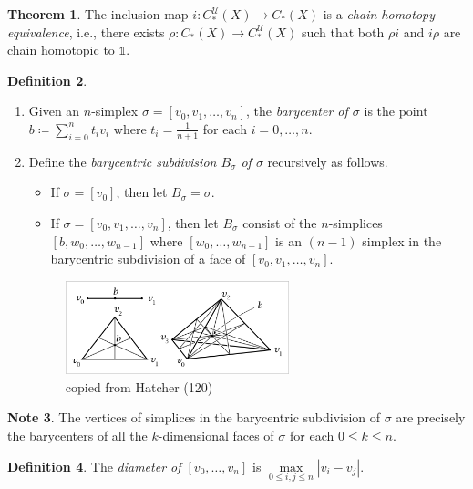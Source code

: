 \documentclass[10pt,letterpaper,cm]{nupset}
\theoremstyle{definition}
\newtheorem{definition}{Definition}[subsection]
\newtheorem{note}[definition]{Note}
\theoremstyle{theorem}
\newtheorem{theorem}[definition]{Theorem}
\theoremstyle{remark}
\newcommand{\U}{\mathcal U}
\newcommand{\1}{\mathbb{1}}
\newcommand{\0}{\vec 0}
\begin{document}
\begin{theorem}
The inclusion map $i: C_{\ast}^{\U}(X) \to C_{\ast}(X)$ is a \textit{chain homotopy equivalence}, i.e., there exists $\rho : C_{\ast}(X) \to C_{\ast}^{\U}(X)$ such that both  $\rho i$ and  $i \rho$ are chain homotopic to $\1$.
\end{theorem}

\begin{definition} $ $
\begin{enumerate}
\item Given an $n$-simplex $\sigma = [v_0, v_1, \ldots, v_n]$, the \textit{barycenter of $\sigma$} is the point $b\coloneqq  \sum_{i=0}^n t_iv_i$ where $t_i = \frac{1}{n+1}$ for each $i=0, \ldots, n$.
\item Define the \textit{barycentric subdivision $B_{\sigma}$ of $\sigma$} recursively as follows.
\begin{itemize}
\item If $\sigma = [v_0]$, then let $B_{\sigma} = \sigma$.
\item If $\sigma = [v_0, v_1, \ldots, v_n]$, then let $B_{\sigma}$ consist of the $n$-simplices $[b, w_0, \ldots, w_{n-1}]$ where $[w_0, \ldots, w_{n-1}]$ is an $(n-1)$ simplex in the barycentric subdivision of a face of $[v_0, v_1, \ldots, v_n]$.
\end{itemize}
\begin{figure}[H]
\centering
\includegraphics[width=65mm]{Hatcher-barycentric.png}
\caption{copied from Hatcher (120) \label{overflow}}
\end{figure}
\end{enumerate}
\end{definition}

\begin{note}
The vertices of simplices in the barycentric subdivision of $\sigma$ are precisely the barycenters of all the $k$-dimensional faces of $\sigma$ for each $0\leq k\leq n$.
\end{note}


\begin{definition}
The \textit{diameter of $[v_0, \ldots, v_n]$} is $\underset{0\leq i,j\leq n}{\max}|v_i - v_j|.$
\end{definition}
\end{document}
